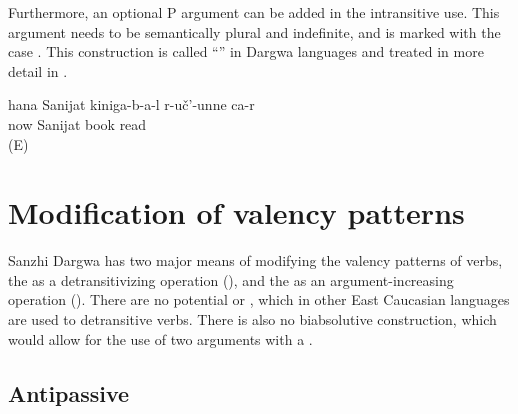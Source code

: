 Furthermore, an optional P argument can be added in the intransitive use. This argument needs to be semantically plural and indefinite, and is marked with the  case . This construction is called ``'' in Dargwa languages and treated in more detail in . 
%
\begin{exe}
	\ex	\label{ex:Now Sanijat reads books}
	\gll	hana Sanijat kiniga-b-a-l	r-uč'-unne	ca-r\\
		now	Sanijat	book	read	\\
	\glt	{} (E)
\end{exe}


\section{Modification of valency patterns}
\label{cpt:Modification of valency patterns}

Sanzhi Dargwa has two major means of modifying the valency patterns of verbs, the  as a detransitivizing operation (), and the  as an argument-increasing operation (). There are no potential or , which in other East Caucasian languages are used to detransitive verbs. There is also no biabsolutive construction, which would allow for the use of two  arguments with a .



\subsection{Antipassive}
\label{sec:Antipassive}

